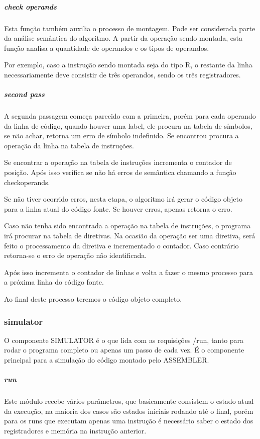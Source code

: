 			\subparagraph{check operands}

				Esta função também auxilia o processo de montagem. Pode ser considerada parte da análise semântica do algoritmo. A partir da operação sendo montada, esta função analisa a quantidade de operandos e os tipos de operandos. 

				Por exemplo, caso a instrução sendo montada seja do tipo R, o restante da linha necessariamente deve consistir de três operandos, sendo os três registradores. 

			\subparagraph{second pass}
			
				A segunda passagem começa parecido com a primeira, porém para cada operando da linha de código, quando houver uma label, ele procura na tabela de símbolos, se não achar, retorna um erro de símbolo indefinido. Se encontrou procura a operação da linha na tabela de instruções.

				Se encontrar a operação na tabela de instruções incrementa o contador de posição. Após isso verifica se não há erros de semântica chamando a função check\textunderscore operands.

				Se não tiver ocorrido erros, nesta etapa, o algoritmo irá gerar o código objeto para a linha atual do código fonte. Se houver erros, apenas retorna o erro.

				Caso não tenha sido encontrada a operação na tabela de instruções, o programa irá procurar na tabela de diretivas. Na ocasião da operação ser uma diretiva, será feito o processamento da diretiva e incrementado o contador. Caso contrário retorna-se o erro de operação não identificada.

				Após isso incrementa o contador de linhas e volta a fazer o mesmo processo para a próxima linha do código fonte.

				Ao final deste processo teremos o código objeto completo.
			
		\subsubsection{simulator}

			O componente SIMULATOR é o que lida com as requisições /run, tanto para rodar o programa completo ou apenas um passo de cada vez. É o componente principal para a simulação do código montado pelo ASSEMBLER.

				\subparagraph{run}

					Este módulo recebe vários parâmetros, que basicamente consistem o estado atual da execução, na maioria dos casos são estados iniciais rodando até o final, porém para os runs que executam apenas uma instrução é necessário saber o estado dos registradores e memória na instrução anterior.


